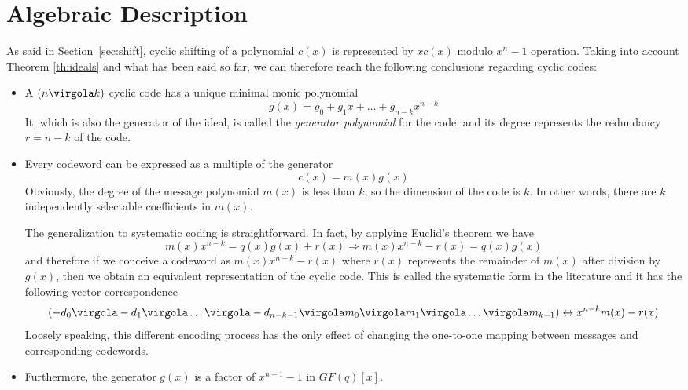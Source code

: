 \section{Algebraic Description}

As said in Section~\ref{sec:shift}, cyclic shifting of a polynomial \(c(x)\) is represented by \(xc(x)\) modulo \(x^n-1\) operation. Taking into account Theorem \ref{th:ideals} and what has been said so far, we can therefore reach the following conclusions regarding cyclic codes:
\begin{itemize}
\item A $(n \virgola k)$ cyclic code has a unique minimal monic polynomial
\begin{equation}
    g(x) = g_0+g_1x+\ldots+g_{n-k}x^{n-k}
\end{equation}
It, which is also the generator of the ideal, is called the \emph{generator polynomial} for the code, and its degree represents the redundancy $r=n-k$ of the code.

\item Every codeword can be expressed as a multiple of the generator
\begin{equation}
c(x)=m(x)g(x)
\end{equation}
Obviously, the degree of the message polynomial $m(x)$ is less than $k$, so the dimension of the code is $k$. In other words, there are $k$ independently selectable coefficients in $m(x)$.

The generalization to systematic coding is straightforward. In fact, by applying Euclid's theorem we have
\begin{equation}
m(x)x^{n-k}= q(x)g(x)+r(x) \Rightarrow m(x)x^{n-k}-r(x) = q(x)g(x)
\end{equation}
and therefore if we conceive a codeword as $m(x)x^{n-k}-r(x)$ where $r(x)$ represents the remainder of $m(x)$ after division by $g(x)$, then we obtain an equivalent representation of the cyclic code. This is called the systematic form in the literature and it has the following vector correspondence
\begin{equation}
(-d_0\virgola -d_1\virgola \ldots \virgola -d_{n-k-1}\virgola m_0 \virgola m_1 \virgola \ldots \virgola m_{k-1}) \leftrightarrow x^{n-k}m(x)-r(x)
\end{equation}
Loosely speaking, this different encoding process has the only effect of changing the one-to-one mapping between messages and corresponding codewords.
\item Furthermore, the generator $g(x)$ is a factor of $x^{n-1}-1$ in $GF(q)[x]$.
\end{itemize}




